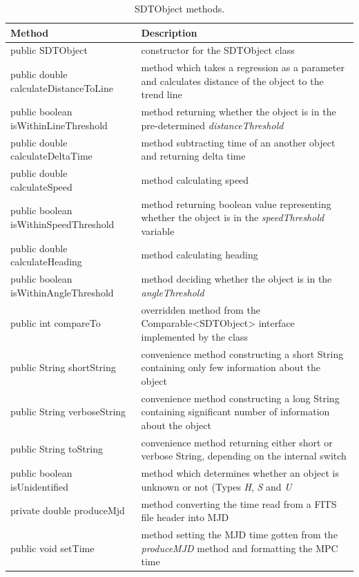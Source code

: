 \begin{table}[H]
\centering
\setlength{\extrarowheight}{2pt}
\begin{tabularx}{\textwidth}{|X|X|}
\hline
\textbf{Method} & \textbf{Description} \\ \hline
public \mbox{SDTObject} & constructor for the SDTObject class \\ \hline
public double \mbox{calculateDistanceToLine} & method which takes a regression as a parameter and calculates distance of the object to the trend line \\ \hline
public boolean \mbox{isWithinLineThreshold} & method returning whether the object is in the pre-determined \emph{distanceThreshold} \\ \hline
public double \mbox{calculateDeltaTime} & method subtracting time of an another object and returning delta time \\ \hline
public double \mbox{calculateSpeed} & method calculating speed \\ \hline
public boolean \mbox{isWithinSpeedThreshold} & method returning boolean value representing whether the object is in the \emph{speedThreshold} variable \\ \hline
public double \mbox{calculateHeading} & method calculating heading \\ \hline
public boolean \mbox{isWithinAngleThreshold} & method deciding whether the object is in the \emph{angleThreshold} \\ \hline
public int \mbox{compareTo} & overridden method from the Comparable<SDTObject> interface implemented by the class \\ \hline
public String \mbox{shortString} & convenience method constructing a short String containing only few information about the object \\ \hline
public String \mbox{verboseString} & convenience method constructing a long String containing significant number of information about the object \\ \hline
public String \mbox{toString} & convenience method returning either short or verbose String, depending on the internal switch \\ \hline
public boolean \mbox{isUnidentified} & method which determines whether an object is unknown or not (Types \emph{H}, \emph{S} and \emph{U} \\ \hline
private double \mbox{produceMjd} & method converting the time read from a FITS file header into MJD \citep{Silha2012id} \\ \hline
public void \mbox{setTime} & method setting the MJD time gotten from the \emph{produceMJD} method and formatting the MPC time \\ \hline
\end{tabularx}
\caption{SDTObject methods.}
\label{tab:class_methods_O}
\end{table}


